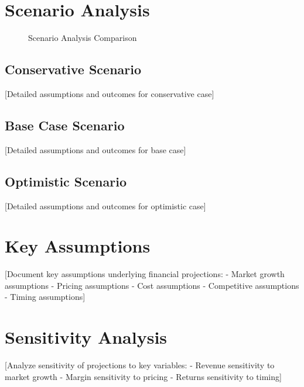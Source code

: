 \documentclass[11pt,letterpaper]{report}
\begin{document}
\section{Scenario Analysis}


\begin{figure}[htbp]
\centering
\caption{Scenario Analysis Comparison}
\label{fig:scenarios}
\end{figure}

\subsection{Conservative Scenario}
[Detailed assumptions and outcomes for conservative case]

\subsection{Base Case Scenario}
[Detailed assumptions and outcomes for base case]

\subsection{Optimistic Scenario}
[Detailed assumptions and outcomes for optimistic case]

\section{Key Assumptions}

[Document key assumptions underlying financial projections:
- Market growth assumptions
- Pricing assumptions
- Cost assumptions
- Competitive assumptions
- Timing assumptions]

\section{Sensitivity Analysis}

[Analyze sensitivity of projections to key variables:
- Revenue sensitivity to market growth
- Margin sensitivity to pricing
- Returns sensitivity to timing]
\end{document}
